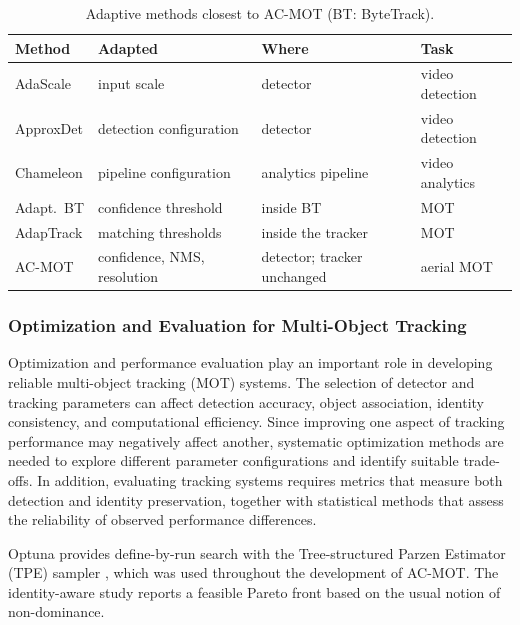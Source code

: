 \documentclass[pdflatex,sn-mathphys-num,iicol]{sn-jnl}
\begin{document}
\begin{table}[t]
\caption{Adaptive methods closest to AC-MOT (BT: ByteTrack).}
\label{tab:related}
\centering\footnotesize
\setlength{\tabcolsep}{3pt}
\begin{tabular}{@{}l>{\raggedright\arraybackslash}p{20mm}>{\raggedright\arraybackslash}p{17mm}>{\raggedright\arraybackslash}p{13mm}@{}}
\toprule
Method & Adapted & Where & Task\\
\midrule
AdaScale \cite{chin2019adascale} & input scale & detector & video detection\\
ApproxDet \cite{xu2020approxdet} & detection configuration & detector & video detection\\
Chameleon \cite{jiang2018chameleon} & pipeline configuration & analytics pipeline & video analytics\\
Adapt.\ BT \cite{ma2023adaptivebytetrack} & confidence threshold & inside BT & MOT\\
AdapTrack \cite{shim2024adaptrack} & matching thresholds & inside the tracker & MOT\\
AC-MOT & confidence, NMS, resolution & detector; tracker unchanged & aerial MOT\\
\bottomrule
\end{tabular}
\end{table}

\subsubsection{Optimization and Evaluation for Multi-Object Tracking}
Optimization and performance evaluation play an important role in developing reliable multi-object tracking (MOT) systems. The selection of detector and tracking parameters can affect detection accuracy, object association, identity consistency, and computational efficiency. Since improving one aspect of tracking performance may negatively affect another, systematic optimization methods are needed to explore different parameter configurations and identify suitable trade-offs. In addition, evaluating tracking systems requires metrics that measure both detection and identity preservation, together with statistical methods that assess the reliability of observed performance differences.

Optuna provides define-by-run search with the Tree-structured Parzen Estimator
(TPE) sampler \cite{akiba2019optuna}, which was used throughout the
development of AC-MOT. The identity-aware study reports a feasible Pareto
front based on the usual notion of non-dominance.
\end{document}

